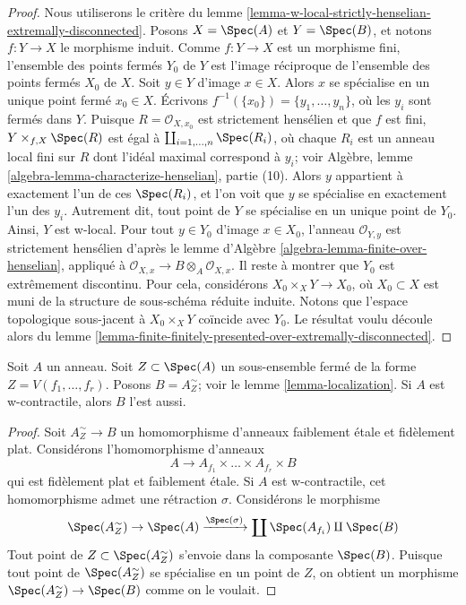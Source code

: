 \begin{proof}
Nous utiliserons le critère du
lemme \ref{lemma-w-local-strictly-henselian-extremally-disconnected}.
Posons $X = \Spec(A)$ et $Y = \Spec(B)$, et notons $f : Y \to X$
le morphisme induit.
Comme $f : Y \to X$ est un morphisme fini, l'ensemble des points fermés
$Y_0$ de $Y$ est l'image réciproque de l'ensemble des points fermés
$X_0$ de $X$. Soit $y \in Y$ d'image $x \in X$. Alors
$x$ se spécialise en un unique point fermé $x_0 \in X$.
Écrivons $f^{-1}(\{x_0\}) = \{y_1, \ldots, y_n\}$, où les $y_i$
sont fermés dans $Y$. Puisque $R = \mathcal{O}_{X, x_0}$ est strictement hensélien
et que $f$ est fini, $Y \times_{f, X} \Spec(R)$ est
égal à $\coprod_{i = 1, \ldots, n} \Spec(R_i)$, où
chaque $R_i$ est un anneau local fini sur $R$
dont l'idéal maximal correspond à $y_i$; voir
Algèbre, lemme \ref{algebra-lemma-characterize-henselian}, partie (10).
Alors $y$ appartient à exactement l'un de ces $\Spec(R_i)$,
et l'on voit que $y$ se spécialise en exactement l'un des $y_i$.
Autrement dit, tout point de $Y$ se spécialise en un unique
point de $Y_0$. Ainsi, $Y$ est w-local.
Pour tout $y \in Y_0$ d'image $x \in X_0$,
l'anneau $\mathcal{O}_{Y, y}$ est strictement hensélien d'après le
lemme d'Algèbre \ref{algebra-lemma-finite-over-henselian},
appliqué à $\mathcal{O}_{X, x} \to B \otimes_A \mathcal{O}_{X, x}$.
Il reste à montrer que $Y_0$ est extrêmement discontinu.
Pour cela, considérons $X_0 \times_X Y \to X_0$,
où $X_0 \subset X$ est muni de la structure de sous-schéma réduite induite.
Notons que l'espace topologique sous-jacent à
$X_0 \times_X Y$ coïncide avec $Y_0$. Le résultat voulu découle alors du
lemme \ref{lemma-finite-finitely-presented-over-extremally-disconnected}.
\end{proof}

\begin{lemma}
\label{lemma-localization-w-contractible}
Soit $A$ un anneau. Soit $Z \subset \Spec(A)$ un sous-ensemble fermé
de la forme $Z = V(f_1, \ldots, f_r)$. Posons $B = A_Z^\sim$; voir le
lemme \ref{lemma-localization}. Si $A$ est w-contractile, alors $B$ l'est aussi.
\end{lemma}

\begin{proof}
Soit $A_Z^\sim \to B$ un homomorphisme d'anneaux faiblement \'etale et fidèlement plat.
Considérons l'homomorphisme d'anneaux
$$
A \longrightarrow A_{f_1} \times \ldots \times A_{f_r} \times B
$$
qui est fidèlement plat et faiblement \'etale. Si $A$ est w-contractile,
cet homomorphisme admet une rétraction $\sigma$. Considérons le morphisme
$$
\Spec(A_Z^\sim) \to \Spec(A) \xrightarrow{\Spec(\sigma)}
\coprod \Spec(A_{f_i}) \amalg \Spec(B)
$$
Tout point de $Z \subset \Spec(A_Z^\sim)$ s'envoie dans la composante
$\Spec(B)$. Puisque tout point de $\Spec(A_Z^\sim)$ se spécialise en un
point de $Z$, on obtient un morphisme $\Spec(A_Z^\sim) \to \Spec(B)$
comme on le voulait.
\end{proof}






